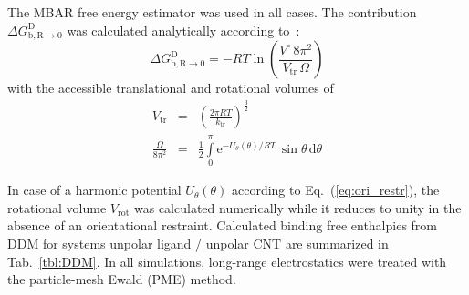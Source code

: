 \documentclass[9pt,lessons,pubversion]{livecoms}
\begin{document}
The MBAR free energy estimator was used in all cases.
The contribution $\Delta G^\mathrm{D}_\mathrm{b, R \rightarrow 0}$ was calculated analytically according to~\cite{hermans1997inclusion}:
\begin{equation}
\Delta G^\mathrm{D}_\mathrm{b, R \rightarrow 0} =  - RT \ln \left(\frac{V^\circ \, 8 \pi^2}{V_\mathrm{tr} \, \Omega} \right) 
\label{eq:DGrottrans_DDM}
\end{equation}
%
with the accessible translational and rotational volumes of
\begin{eqnarray}
V_\mathrm{tr} & = & \left( \frac{2 \pi RT}{k_\mathrm{tr}}\right)^\frac{3}{2} \\
\frac{\Omega}{8 \pi^2} & = & \frac{1}{2} \int\limits_{0}^{\pi} \mathrm{e}^{- U_\theta(\theta)/RT} \, \sin\theta \, \mathrm{d}\theta
\end{eqnarray}


In case of a harmonic potential $U_\theta(\theta)$ according to Eq.~(\ref{eq:ori_restr}), the rotational volume $V_\mathrm{rot}$ was calculated numerically while it reduces to unity in the absence of an orientational restraint. 
Calculated binding free enthalpies from DDM for systems unpolar ligand / unpolar CNT are summarized in Tab.~\ref{tbl:DDM}. 
In all simulations, long-range electrostatics were treated with  the particle-mesh Ewald (PME) method.
\end{document}

